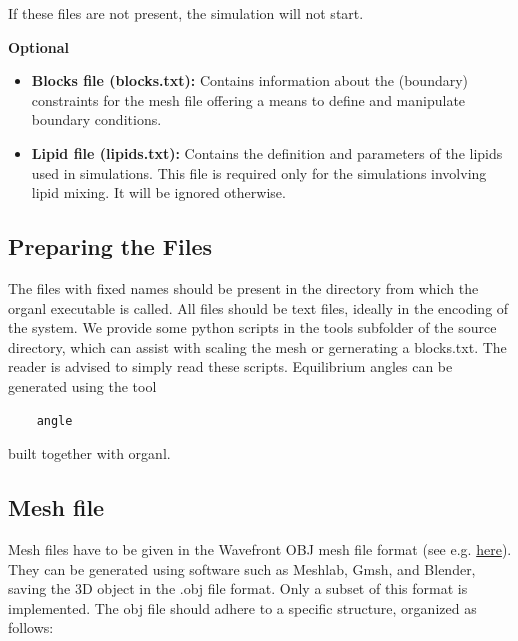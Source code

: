 \documentclass[11pt]{article}
\begin{document}
If these files are not present, the simulation will not start.

\textbf{Optional}
\begin{itemize}
\item \textbf{Blocks file (blocks.txt):} Contains information about the (boundary) constraints for the mesh file  offering a means to define and manipulate boundary conditions.

\item \textbf{Lipid file (lipids.txt):} Contains the definition and parameters of the lipids used in simulations. This file is required only for the simulations involving lipid mixing. It will be ignored otherwise.

\end{itemize}

\subsection{Preparing the Files}
The files with fixed names should be present in the directory from which the organl executable is called. All files should be text files, ideally in the encoding of the system. We provide some python scripts in the tools subfolder of the source directory, which can assist with scaling the mesh or gernerating a blocks.txt. 
The reader is advised to simply read these scripts. Equilibrium angles can be generated using the tool 
\begin{verbatim}
    angle
\end{verbatim}
built together with organl. 

\subsection{Mesh file}
Mesh files have to be given in the Wavefront OBJ mesh file format (see e.g. \href{https://en.wikipedia.org/wiki/Wavefront_.obj_file}{here}). They can be generated using software such as Meshlab, Gmsh, and Blender, saving the 3D object in the .obj file format. Only a subset of this format is implemented. The obj file should adhere to a specific structure, organized as follows:
\end{document}
